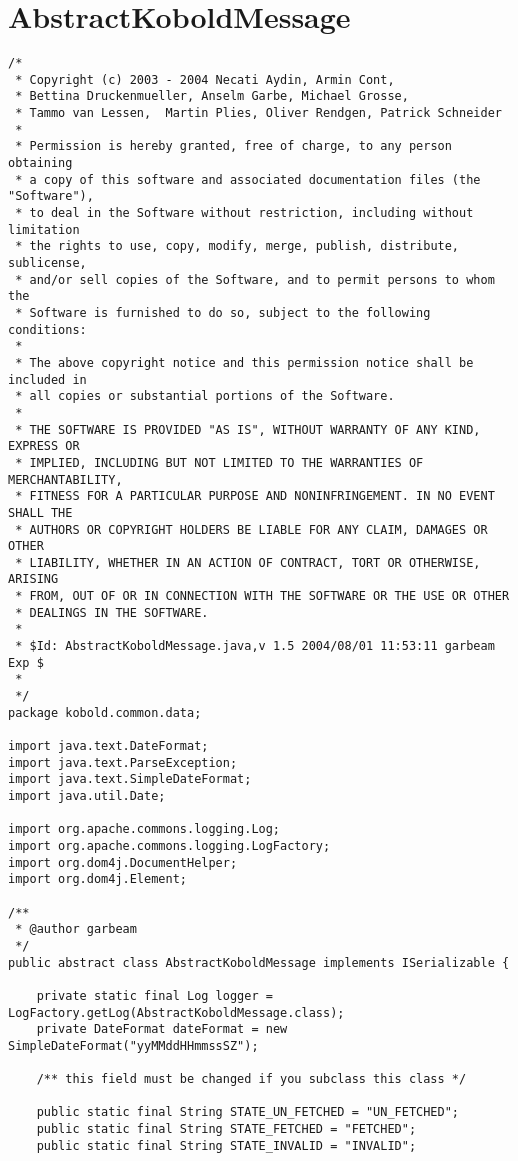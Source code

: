\section{AbstractKoboldMessage}
\small \begin{verbatim}
/*
 * Copyright (c) 2003 - 2004 Necati Aydin, Armin Cont, 
 * Bettina Druckenmueller, Anselm Garbe, Michael Grosse, 
 * Tammo van Lessen,  Martin Plies, Oliver Rendgen, Patrick Schneider
 * 
 * Permission is hereby granted, free of charge, to any person obtaining
 * a copy of this software and associated documentation files (the "Software"),
 * to deal in the Software without restriction, including without limitation
 * the rights to use, copy, modify, merge, publish, distribute, sublicense, 
 * and/or sell copies of the Software, and to permit persons to whom the 
 * Software is furnished to do so, subject to the following conditions:
 *
 * The above copyright notice and this permission notice shall be included in 
 * all copies or substantial portions of the Software.
 *
 * THE SOFTWARE IS PROVIDED "AS IS", WITHOUT WARRANTY OF ANY KIND, EXPRESS OR 
 * IMPLIED, INCLUDING BUT NOT LIMITED TO THE WARRANTIES OF MERCHANTABILITY, 
 * FITNESS FOR A PARTICULAR PURPOSE AND NONINFRINGEMENT. IN NO EVENT SHALL THE 
 * AUTHORS OR COPYRIGHT HOLDERS BE LIABLE FOR ANY CLAIM, DAMAGES OR OTHER 
 * LIABILITY, WHETHER IN AN ACTION OF CONTRACT, TORT OR OTHERWISE, ARISING 
 * FROM, OUT OF OR IN CONNECTION WITH THE SOFTWARE OR THE USE OR OTHER 
 * DEALINGS IN THE SOFTWARE.
 *
 * $Id: AbstractKoboldMessage.java,v 1.5 2004/08/01 11:53:11 garbeam Exp $
 *
 */
package kobold.common.data;

import java.text.DateFormat;
import java.text.ParseException;
import java.text.SimpleDateFormat;
import java.util.Date;

import org.apache.commons.logging.Log;
import org.apache.commons.logging.LogFactory;
import org.dom4j.DocumentHelper;
import org.dom4j.Element;

/**
 * @author garbeam
 */
public abstract class AbstractKoboldMessage implements ISerializable {

	private static final Log logger = LogFactory.getLog(AbstractKoboldMessage.class);
	private DateFormat dateFormat = new SimpleDateFormat("yyMMddHHmmssSZ");
	
	/** this field must be changed if you subclass this class */
	
	public static final String STATE_UN_FETCHED = "UN_FETCHED"; 
	public static final String STATE_FETCHED = "FETCHED";
	public static final String STATE_INVALID = "INVALID";
	

\end{verbatim}
